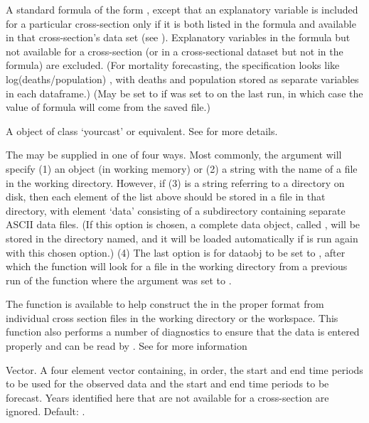 \begin{Arguments}
\begin{ldescription}
\item[\code{formula}]  A standard \R{} formula of the form , except that an explanatory variable is included for a
particular cross-section only if it is both listed in the formula
and available in that cross-section's data set (see
). Explanatory variables in the formula but not available for
a cross-section (or in a cross-sectional dataset but not in the
formula) are excluded. (For mortality forecasting, the specification
looks like log(deaths/population) , with deaths
and population stored as separate variables in each dataframe.) (May
be set to  if  was set to  on
the last run, in which case the value of formula will come from the
saved file.)

\item[\code{dataobj}] A object of class `yourcast' or equivalent. See
 for more details.

The  may be supplied in one of four ways. Most
commonly, the argument will specify (1) an
object (in working memory) or (2) a string with the name of a file
in the working directory. However, if (3)  is a string
referring to a directory on disk, then
each element of the list above should be stored in a file in that
directory, with element `data' consisting of a subdirectory
containing separate ASCII data files. (If this option is chosen, a
complete data object, called , will be stored in the
directory named, and it will be loaded automatically if
 is run again with this chosen option.)
(4) The last option is for dataobj to be set to , after
which the function will look for a  file in the
working directory from a previous run of the function where the
argument  was set to .

The function  is available to help construct
the  in the proper format from individual cross section
files in the working directory or the workspace. This function also
performs a number of diagnostics to
ensure that the data is entered properly and can be read by
. See  for more information

\item[\code{sample.frame}] Vector. A four element vector containing, in order, the start
and end time periods to be used for the observed data and the start
and end time periods to be forecast. Years identified here that are
not available for a cross-section are ignored. Default:
.


\end{ldescription}
\end{Arguments}
